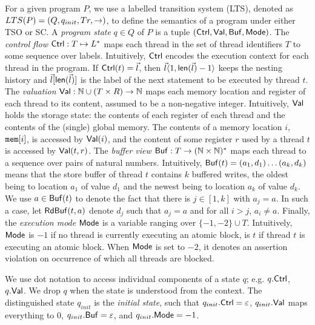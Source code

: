For a given program $P$, we use a labelled transition system (LTS), denoted as $\mathnormal{LTS}(P)=(Q,q_{init},Tr,\rightarrow)$, to define the semantics of a program under either TSO or SC.
A {\em program state} $q\in Q$ of $P$ is a tuple $(\mathsf{Ctrl},\mathsf{Val},\mathsf{Buf},\mathsf{Mode})$.
The {\em control flow} $\mathsf{Ctrl}:T \mapsto L^*$ maps each thread in the set of thread identifiers $T$ to some sequence over labels.
Intuitively, $\mathsf{Ctrl}$ encodes the execution context for each thread in the program.
If $\mathsf{Ctrl}(t)=\vec{l}$, then $\vec{l} \langle 1,\mathsf{len}(\vec{l})-1\rangle$ keeps the nesting history and $\vec{l}[\mathsf{len}(\vec{l})]$ is the label of the next statement to be executed by thread $t$.
The {\em valuation} $\mathsf{Val}:\mathbb{N}\cup (T\times R) \rightarrow \mathbb{N}$ maps each memory location and register of each thread to its content, assumed to be a non-negative integer.
Intuitively, $\mathsf{Val}$ holds the storage state: the contents of each register of each thread and the contents of the (single) global memory.
The contents of a memory location $i$, $\mathtt{mem}[i]$, is accessed by $\mathsf{Val}(i)$, and the content of some register $r$ used by a thread $t$ is accessed by $\mathsf{Val}(t,r)$.
The {\em buffer view} $\mathsf{Buf}:T \rightarrow (\mathbb{N}\times\mathbb{N})^*$ maps each thread to a sequence over pairs of natural numbers.
Intuitively, $\mathsf{Buf}(t)=(a_1,d_1)\ldots(a_k,d_k)$ means that the store buffer of thread $t$ contains $k$ buffered writes, the oldest being to location $a_1$ of value $d_1$ and the newest being to location $a_k$ of value $d_k$.
We use $a\in\mathsf{Buf}(t)$ to denote the fact that there is $j\in[1,k]$ with $a_j=a$.
In such a case, let $\mathsf{RdBuf}(t,a)$ denote $d_j$ such that $a_j=a$ and for all $i>j$, $a_i\neq a$.
Finally, the {\em execution mode} $\mathsf{Mode}$ is a variable ranging over $\{-1,-2\}\cup T$.
Intuitively, $\mathsf{Mode}$ is $-1$ if no thread is currently executing an atomic block, is $t$ if thread $t$ is executing an atomic block.
When $\mathsf{Mode}$ is set to $-2$, it denotes an assertion violation on occurrence of which all threads are blocked.

We use dot notation to access individual components of a state $q$; e.g. $q.\mathsf{Ctrl}$, $q.\mathsf{Val}$.
We drop $q$ when the state is understood from the context.
The distinguished state $q_{init}$ is the {\em initial state}, such that $q_{init}.\mathsf{Ctrl}=\varepsilon$, $q_{init}.\mathsf{Val}$ maps everything to 0, $q_{init}.\mathsf{Buf}=\varepsilon$, and $q_{init}.\mathsf{Mode}=-1$.

